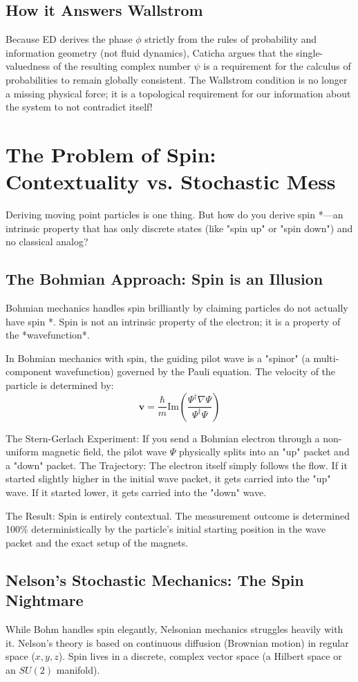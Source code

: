 \documentclass[11pt]{article}
\begin{document}
\subsection{How it Answers Wallstrom}
Because ED derives the phase $\phi$ strictly from the rules of probability
and information geometry (not fluid dynamics), Caticha argues that the
single-valuedness of the resulting complex number $\psi$ is a requirement
for the calculus of probabilities to remain globally consistent. The
Wallstrom condition is no longer a missing physical force; it is a 
topological requirement for our information about the system to not 
contradict itself!

\section{The Problem of Spin: Contextuality vs. Stochastic Mess}
Deriving moving point particles is one thing. But how do you derive 
spin *—an intrinsic property that has only discrete states 
(like "spin up" or "spin down") and no classical analog?
\subsection{The Bohmian Approach: Spin is an Illusion}
Bohmian mechanics handles spin brilliantly by claiming particles do not actually have spin *. Spin is not an intrinsic property of the electron; it is a property of the *wavefunction*.

In Bohmian mechanics with spin, the guiding pilot wave is a "spinor" (a
multi-component wavefunction) governed by the Pauli equation. The velocity
of the particle is determined by:
$$\mathbf{v} = \frac{\hbar}{m} \text{Im} \left( \frac{\Psi^\dagger \nabla
\Psi}{\Psi^\dagger \Psi} \right)$$

  The Stern-Gerlach Experiment:  If you send a Bohmian electron through
a non-uniform magnetic field, the pilot wave $\Psi$ physically splits into
an "up" packet and a "down" packet. 
  The Trajectory:  The electron itself simply follows the flow. If it
started slightly higher in the initial wave packet, it gets carried into
the "up" wave. If it started lower, it gets carried into the "down" wave.

  The Result:  Spin is entirely contextual. The measurement outcome
is determined 100\% deterministically by the particle's initial starting
position in the wave packet and the exact setup of the magnets. 
\subsection{Nelson's Stochastic Mechanics: The Spin Nightmare}
While Bohm handles spin elegantly, Nelsonian mechanics struggles heavily with it. 
 Nelson's theory is based on continuous diffusion (Brownian motion) in regular space ($x, y, z$). 
 Spin lives in a discrete, complex vector space (a Hilbert space or an $SU(2)$ manifold). 
\end{document}
